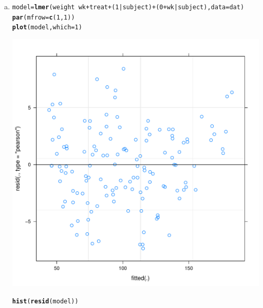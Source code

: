 \documentclass{article}\usepackage[]{graphicx}\usepackage[]{color}
\makeatletter
\def\maxwidth{ %
  \ifdim\Gin@nat@width>\linewidth
    \linewidth
  \else
    \Gin@nat@width
  \fi
}
\newcommand{\hlnum}[1]{\textcolor[rgb]{0.686,0.059,0.569}{#1}}%
\newcommand{\hlopt}[1]{\textcolor[rgb]{0,0,0}{#1}}%
\newcommand{\hlstd}[1]{\textcolor[rgb]{0.345,0.345,0.345}{#1}}%
\newcommand{\hlkwb}[1]{\textcolor[rgb]{0.69,0.353,0.396}{#1}}%
\newcommand{\hlkwc}[1]{\textcolor[rgb]{0.333,0.667,0.333}{#1}}%
\newcommand{\hlkwd}[1]{\textcolor[rgb]{0.737,0.353,0.396}{\textbf{#1}}}%
\newenvironment{kframe}{%
 \def\at@end@of@kframe{}%
 \ifinner\ifhmode%
  \def\at@end@of@kframe{\end{minipage}}%
  \begin{minipage}{\columnwidth}%
 \fi\fi%
 \def\FrameCommand##1{\hskip\@totalleftmargin \hskip-\fboxsep
 \colorbox{shadecolor}{##1}\hskip-\fboxsep
     \hskip-\linewidth \hskip-\@totalleftmargin \hskip\columnwidth}%
 \MakeFramed {\advance\hsize-\width
   \@totalleftmargin\z@ \linewidth\hsize
   \@setminipage}}%
 {\par\unskip\endMakeFramed%
 \at@end@of@kframe}
\newenvironment{knitrout}{}{} %
\makeatother
\begin{document}
\begin{enumerate}[(a)]

\item

\begin{knitrout}
\color{fgcolor}\begin{kframe}
\begin{alltt}
  \hlstd{model} \hlkwb{=} \hlkwd{lmer}\hlstd{(weight} \hlopt{~} \hlstd{wk} \hlopt{+} \hlstd{treat}  \hlopt{+} \hlstd{(}\hlnum{1}\hlopt{|}\hlstd{subject)} \hlopt{+} \hlstd{(}\hlnum{0} \hlopt{+} \hlstd{wk}\hlopt{|}\hlstd{subject),} \hlkwc{data} \hlstd{= dat)}
  \hlkwd{par}\hlstd{(} \hlkwc{mfrow} \hlstd{=} \hlkwd{c}\hlstd{(}\hlnum{1}\hlstd{,} \hlnum{1}\hlstd{))}
  \hlkwd{plot}\hlstd{(model,} \hlkwc{which} \hlstd{=} \hlnum{1}\hlstd{)}
\end{alltt}
\end{kframe}
\includegraphics[width=\maxwidth]{figure/unnamed-chunk-12-1} 
\begin{kframe}\begin{alltt}
  \hlkwd{hist}\hlstd{(}\hlkwd{resid}\hlstd{(model))}
\end{alltt}
\end{kframe}

\end{knitrout}
\end{enumerate}
\end{document}
